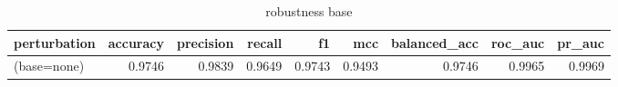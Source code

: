 \begin{table}[htbp]
\caption{robustness base}
\label{tab:robustness_base}
\begin{tabular}{lrrrrrrrr}
\toprule
perturbation & accuracy & precision & recall & f1 & mcc & balanced_acc & roc_auc & pr_auc \\
\midrule
(base=none) & 0.9746 & 0.9839 & 0.9649 & 0.9743 & 0.9493 & 0.9746 & 0.9965 & 0.9969 \\
\bottomrule
\end{tabular}
\end{table}
